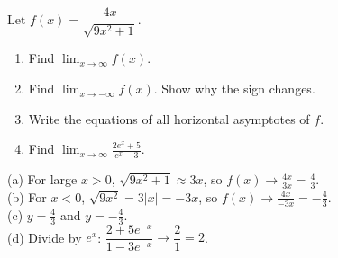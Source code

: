\begin{exo}{}
Let $f(x)=\dfrac{4x}{\sqrt{9x^2+1}}$.
\begin{enumerate}[label=(\alph*)]
\item Find $\displaystyle\lim_{x\to\infty}f(x)$.
\item Find $\displaystyle\lim_{x\to-\infty}f(x)$. Show why the sign changes.
\item Write the equations of all horizontal asymptotes of $f$.
\item Find $\displaystyle\lim_{x\to\infty}\frac{2e^x+5}{e^x-3}$.
\end{enumerate}
\begin{solution}
(a) For large $x>0$, $\sqrt{9x^2+1}\approx3x$, so $f(x)\to\frac{4x}{3x}=\frac43$.\\
(b) For $x<0$, $\sqrt{9x^2}=3|x|=-3x$, so $f(x)\to\frac{4x}{-3x}=-\frac43$.\\
(c) $y=\frac43$ and $y=-\frac43$.\\
(d) Divide by $e^x$: $\dfrac{2+5e^{-x}}{1-3e^{-x}}\to\dfrac{2}{1}=2$.
\end{solution}
\end{exo}


